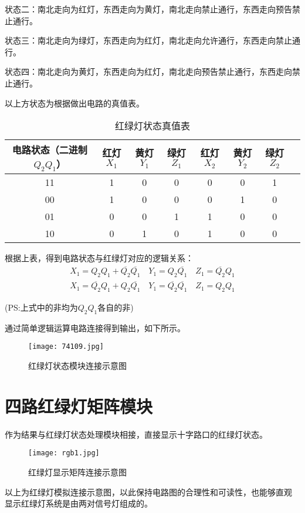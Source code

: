 \documentclass[AutoFakeBold]{LZUThesis}
\begin{document}
状态二：南北走向为红灯，东西走向为黄灯，南北走向禁止通行，东西走向预告禁止通行。

状态三：南北走向为绿灯，东西走向为红灯，南北走向允许通行，东西走向禁止通行。

状态四：南北走向为黄灯，东西走向为红灯，南北走向预告禁止通行，东西走向禁止通行。

以上方状态为根据做出电路的真值表。
\begin{table}[!ht] %
    \centering %
    \caption{红绿灯状态真值表}
    \begin{tabular}{|c|c|c|c|c|c|c|c|} \hline %
    电路状态（二进制$Q_2Q_1$） & 红灯$X_1$ & 黄灯$Y_1$ & 绿灯$Z_1$ & 红灯$X_2$ & 黄灯$Y_2$ & 绿灯$Z_2$   \\ \hline
    11 & 1 & 0 & 0 & 0 & 0 & 1  \\ \hline
    00 & 1 & 0 & 0 & 0 & 1 & 0 \\ \hline
    01 & 0 & 0 & 1 & 1 & 0 & 0 \\ \hline
    10 & 0 & 1 & 0 & 1 & 0 & 0 \\ \hline
    \end{tabular}
    \end{table}

根据上表，得到电路状态与红绿灯对应的逻辑关系：
\begin{align}
    X_1=Q_2Q_1+\overline{Q_2}\overline{Q_1}  \quad 
    Y_1=Q_2\overline{Q_1} \quad 
    Z_1=\overline{Q_2}Q_1\nonumber \\
    X_1=\overline{Q_2}Q_1+Q_2\overline{Q_1}  \quad 
    Y_1=\overline{Q_2}\overline{Q_1} \quad 
    Z_1=Q_2Q_1\nonumber
\end{align}

(PS:上式中的非均为$Q_2Q_1$各自的非)

通过简单逻辑运算电路连接得到输出，如下所示。

\begin{figure}[htbp]
    \centering
    \texttt{[image: 74109.jpg]}
    \caption{红绿灯状态模块连接示意图}
\end{figure}


\section{四路红绿灯矩阵模块}
作为结果与红绿灯状态处理模块相接，直接显示十字路口的红绿灯状态。

\begin{figure}[htbp]
    \centering
    \texttt{[image: rgb1.jpg]}
    \caption{红绿灯显示矩阵连接示意图}
\end{figure}
以上为红绿灯模拟连接示意图，以此保持电路图的合理性和可读性，也能够直观
显示红绿灯系统是由两对信号灯组成的。
\end{document}
